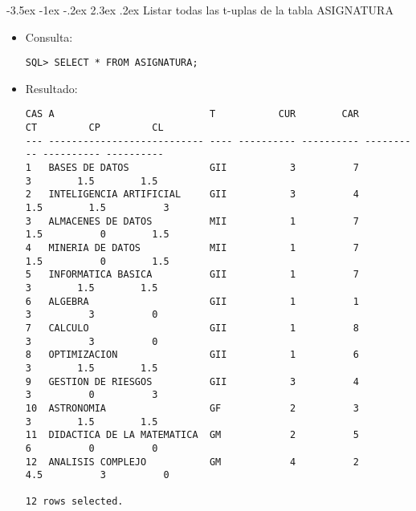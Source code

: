 \documentclass[11pt]{report}
\makeatletter
\renewcommand\chapter{\@startsection{chapter}{0}{\z@}%
    {-3.5ex \@plus -1ex \@minus -.2ex}%
    {2.3ex \@plus.2ex}%
    {\normalfont\Large\bfseries}}
\makeatother
\begin{document}
\chapter{Listar todas las t-uplas de la tabla ASIGNATURA}
\begin{itemize}
  \item Consulta:
  \begin{verbatim}
SQL> SELECT * FROM ASIGNATURA;
  \end{verbatim}
  \item{Resultado:}
  \begin{verbatim}
CAS A                           T           CUR        CAR         CT         CP         CL                                                                               
--- --------------------------- ---- ---------- ---------- ---------- ---------- ----------                                                                               
1   BASES DE DATOS              GII           3          7          3        1.5        1.5                                                                               
2   INTELIGENCIA ARTIFICIAL     GII           3          4        1.5        1.5          3                                                                               
3   ALMACENES DE DATOS          MII           1          7        1.5          0        1.5                                                                               
4   MINERIA DE DATOS            MII           1          7        1.5          0        1.5                                                                               
5   INFORMATICA BASICA          GII           1          7          3        1.5        1.5                                                                               
6   ALGEBRA                     GII           1          1          3          3          0                                                                               
7   CALCULO                     GII           1          8          3          3          0                                                                               
8   OPTIMIZACION                GII           1          6          3        1.5        1.5                                                                               
9   GESTION DE RIESGOS          GII           3          4          3          0          3                                                                               
10  ASTRONOMIA                  GF            2          3          3        1.5        1.5                                                                               
11  DIDACTICA DE LA MATEMATICA  GM            2          5          6          0          0                                                                               
12  ANALISIS COMPLEJO           GM            4          2        4.5          3          0                                                                               

12 rows selected.
  \end{verbatim}
\end{itemize}
\end{document}
